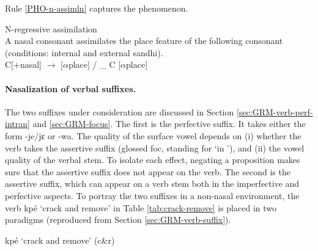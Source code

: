 Rule \ref{PHO-n-assimln} captures the phenomenon.
% 
\begin{Rule}\label{PHO-n-assimln}{N-regressive assimilation}\\
A nasal consonant assimilates the place feature of the following consonant
 (conditions: internal and external sandhi).\\
C[{\sc +nasal}] $\rightarrow$   [$\alpha${\sc place}] /  \_  C [$\alpha${\sc place}]
\end{Rule}



\paragraph{Nasalization of verbal suffixes.}
\label{sec:nasalization-verb-suffix}

The two suffixes under consideration are discussed in Section
\ref{sec:GRM-verb-perf-intran}
and \ref{sec:GRM-focus}.  The first is  the perfective suffix.  It takes
either the form {\sls -je/jɛ} or {\sls -wa}.
The quality of the surface vowel depends on (i) whether the verb takes the
assertive suffix (glossed {\sc foc}, standing for `in '),  and (ii) the
vowel quality of the verbal stem. To isolate each effect, negating a proposition
makes sure that the assertive suffix does not appear on the verb. The second is
the assertive suffix, which can appear on a verb stem both in the imperfective
and perfective aspects.  To portray the two suffixes in a non-nasal environment,
 the verb {\sls kpé} `crack and remove' in Table \ref{tab:crack-remove}  is 
placed in two paradigms (reproduced from Section \ref{sec:GRM-verb-suffix}). 



\begin{table}


\caption{{\sls kpé} {\rm `crack
and remove'} (c\&r)  \label{tab:crack-remove}}

\quad
{}
\end{table}

